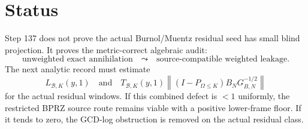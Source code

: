 \documentclass[11pt]{article}
\newcommand{\B}{\mathcal B}
\begin{document}
\section{Status}
Step 137 does not prove the actual Burnol/Muentz residual seed has small blind projection. It proves the metric-correct algebraic audit:
\[
  \text{unweighted exact annihilation}
  \quad\leadsto\quad
  \text{source-compatible weighted leakage.}
\]
The next analytic record must estimate
\[
  L_{\B,K}(y,1)
  \quad\text{and}\quad
  T_{\B,K}(y,1)
  \left\|(I-P_{\Omega\le K})B_NG_{B,N}^{-1/2}\right\|
\]
for the actual residual windows. If this combined defect is $<1$ uniformly, the restricted BPRZ source route remains viable with a positive lower-frame floor. If it tends to zero, the GCD-log obstruction is removed on the actual residual class.
\end{document}
